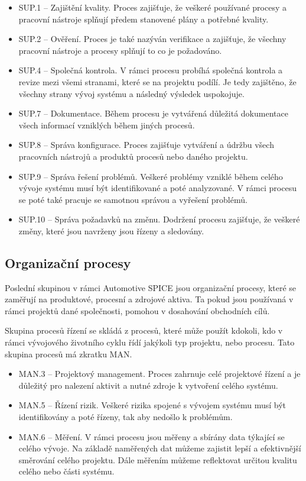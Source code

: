 \documentclass[czech,master]{diploma}
\begin{document}
\begin{itemize}
\item SUP.1 -- Zajištění kvality. Proces zajišťuje, že veškeré používané procesy a pracovní nástroje splňují předem stanovené plány a potřebné kvality.
\item SUP.2 -- Ověření. Proces je také nazýván verifikace a zajišťuje, že všechny pracovní nástroje a procesy splňují to co je požadováno.
\item SUP.4 -- Společná kontrola. V rámci procesu probíhá společná kontrola a revize mezi všemi stranami, které se na projektu podílí. Je tedy zajištěno, že všechny strany vývoj systému a následný výsledek uspokojuje.
\item SUP.7 -- Dokumentace. Během procesu je vytvářená důležitá dokumentace všech informací vzniklých během jiných procesů.
\item SUP.8 -- Správa konfigurace. Proces zajišťuje vytváření a údržbu všech pracovních nástrojů a produktů procesů nebo daného projektu.
\item SUP.9 -- Správa řešení problémů. Veškeré problémy vzniklé během celého vývoje systému musí být identifikované a poté analyzované. V rámci procesu se poté také pracuje se samotnou správou a vyřešení problémů.
\item SUP.10 -- Správa požadavků na změnu. Dodržení procesu zajišťuje, že veškeré změny, které jsou navrženy jsou řízeny a sledovány.
\end{itemize}

\subsection{Organizační procesy}
Poslední skupinou v rámci Automotive SPICE jsou organizační procesy, které se zaměřují na produktové, procesní a zdrojové aktiva. Ta pokud jsou používaná v rámci projektů dané společnosti, pomohou v dosahování obchodních cílů.

Skupina procesů řízení se skládá z procesů, které může použít kdokoli, kdo v rámci vývojového životního cyklu řídí jakýkoli typ projektu, nebo procesu. Tato skupina procesů má zkratku MAN.

\begin{itemize}
\item MAN.3 -- Projektový management. Proces zahrnuje celé projektové řízení a je důležitý pro nalezení aktivit a nutné zdroje k vytvoření celého systému.
\item MAN.5 -- Řízení rizik. Veškeré rizika spojené s vývojem systému musí být identifikovány a poté řízeny, tak aby nedošlo k problémům.
\item MAN.6 -- Měření. V rámci procesu jsou měřeny a sbírány data týkající se celého vývoje. Na základě naměřených dat můžeme zajistit lepší a efektivnější směrování celého projektu. Dále měřením můžeme reflektovat určitou kvalitu celého nebo části systému.
\end{itemize}
\end{document}
